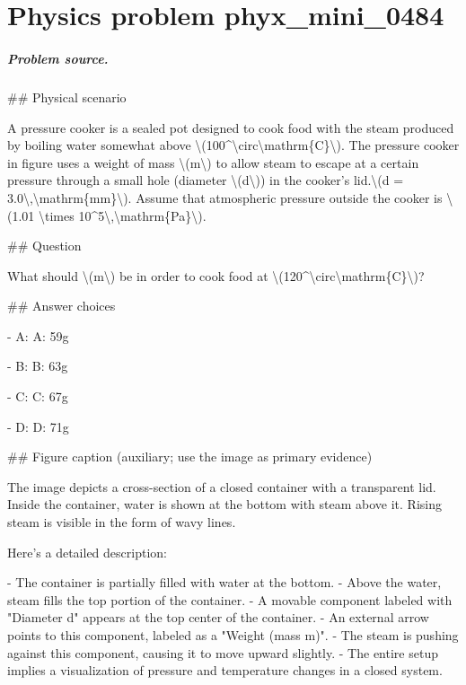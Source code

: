 
\chapter{Physics problem phyx\_mini\_0484}
\label{ch:PhyXMiniProblems_problem_phyx_mini_0484}

\paragraph{Problem source.}
\#\# Physical scenario

A pressure cooker is a sealed pot designed to cook food with the steam produced by boiling water somewhat above \textbackslash{}(100\textasciicircum{}\textbackslash{}circ\textbackslash{}mathrm\{C\}\textbackslash{}). The pressure cooker in figure uses a weight of mass \textbackslash{}(m\textbackslash{}) to allow steam to escape at a certain pressure through a small hole (diameter \textbackslash{}(d\textbackslash{})) in the cooker's lid.\textbackslash{}(d = 3.0\textbackslash{},\textbackslash{}mathrm\{mm\}\textbackslash{}). Assume that atmospheric pressure outside the cooker is \textbackslash{}(1.01 \textbackslash{}times 10\textasciicircum{}5\textbackslash{},\textbackslash{}mathrm\{Pa\}\textbackslash{}).

\#\# Question

What should \textbackslash{}(m\textbackslash{}) be in order to cook food at \textbackslash{}(120\textasciicircum{}\textbackslash{}circ\textbackslash{}mathrm\{C\}\textbackslash{})?

\#\# Answer choices

- A: A: 59g

- B: B: 63g

- C: C: 67g

- D: D: 71g

\#\# Figure caption (auxiliary; use the image as primary evidence)

The image depicts a cross-section of a closed container with a transparent lid. Inside the container, water is shown at the bottom with steam above it. Rising steam is visible in the form of wavy lines.

Here's a detailed description:

- The container is partially filled with water at the bottom.
- Above the water, steam fills the top portion of the container.
- A movable component labeled with "Diameter d" appears at the top center of the container.
- An external arrow points to this component, labeled as a "Weight (mass m)".
- The steam is pushing against this component, causing it to move upward slightly.
- The entire setup implies a visualization of pressure and temperature changes in a closed system.

